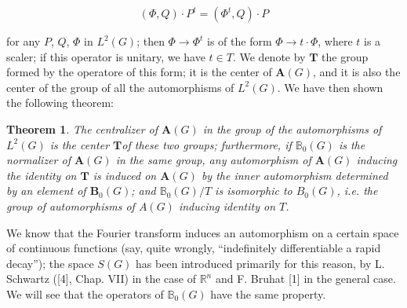 \documentclass[12pt]{amsart}
\newtheorem{thm}{Theorem}
\def\bR{{\mathbb{R}}}
\def\bB{{\mathbb{B}}}
\newcounter{ssection}
\renewcommand{\subsection}{
  \addtocounter{ssection}{1}{\bf  \arabic{ssection}.\  }}
\begin{document}
\[
(\Phi,Q)\cdot P^{t}=(\Phi^{t},Q)\cdot P\]


for any $P$, $Q$, $\Phi$ in $L^{2}(G)$; then $\Phi\rightarrow\Phi^{t}$
is of the form $\Phi\rightarrow t\cdot\Phi$, where $t$ is a scaler;
if this operator is unitary, we have $t\in T$. We denote by $\mathbf{T}$
the group formed by the operatore of this form; it is the center of
$\mathbf{A}(G)$, and it is also the center of the group of all the
automorphisms of $L^{2}(G)$. We have then shown the following theorem:

\begin{thm}\label{th:1}
The centralizer of $\mathbf{A}(G)$ in the group of the
automorphisms of $L^{2}(G)$ is the center $\mathbf{T}$of these two
groups; furthermore, if $\bB_{0}(G)$ is the normalizer of $\mathbf{A}(G)$
in the same group, any automorphism of $\mathbf{A}(G)$ inducing the
identity on $\mathbf{T}$ is induced on $\mathbf{A}(G)$ by the inner
automorphism determined by an element of $\mathbf{B}_{0}(G)$; and
$\bB_0(G)/T$ is isomorphic to $B_0(G)$, 	
i.e. the group of automorphisms of $A(G)$ inducing identity on $T$.
\end{thm}

\subsection{}
We know that the Fourier transform induces 
an automorphism on a certain space of continuous functions 
(say, quite wrongly, ``indefinitely differentiable a rapid decay'');
 the space $S(G)$ has been introduced primarily for this reason, 
by L. Schwartz ([4], Chap. VII) in the case of $\bR^n$ 
and F. Bruhat [1] in the general case.
We will see that the operators of $\bB_0(G)$ have the same property.
\end{document}
